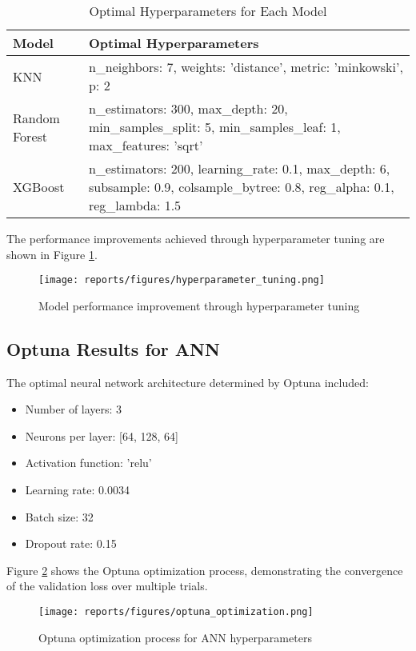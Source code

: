 \documentclass[12pt]{article}
\begin{document}
\begin{table}[h]
\centering
\caption{Optimal Hyperparameters for Each Model}
\label{tab:optimal_hyperparameters}
\begin{tabular}{|l|p{10cm}|}
\hline
\textbf{Model} & \textbf{Optimal Hyperparameters} \\
\hline
KNN & n\_neighbors: 7, weights: 'distance', metric: 'minkowski', p: 2 \\
\hline
Random Forest & n\_estimators: 300, max\_depth: 20, min\_samples\_split: 5, min\_samples\_leaf: 1, max\_features: 'sqrt' \\
\hline
XGBoost & n\_estimators: 200, learning\_rate: 0.1, max\_depth: 6, subsample: 0.9, colsample\_bytree: 0.8, reg\_alpha: 0.1, reg\_lambda: 1.5 \\
\hline
\end{tabular}
\end{table}

The performance improvements achieved through hyperparameter tuning are shown in Figure \ref{fig:hyperparameter_tuning}.

\begin{figure}[h]
\centering
\texttt{[image: reports/figures/hyperparameter\_tuning.png]}
\caption{Model performance improvement through hyperparameter tuning}
\label{fig:hyperparameter_tuning}
\end{figure}

\subsection{Optuna Results for ANN}
\label{subsec:optuna_results}

The optimal neural network architecture determined by Optuna included:
\begin{itemize}
    \item Number of layers: 3
    \item Neurons per layer: [64, 128, 64]
    \item Activation function: 'relu'
    \item Learning rate: 0.0034
    \item Batch size: 32
    \item Dropout rate: 0.15
\end{itemize}

Figure \ref{fig:optuna_optimization} shows the Optuna optimization process, demonstrating the convergence of the validation loss over multiple trials.

\begin{figure}[h]
\centering
\texttt{[image: reports/figures/optuna\_optimization.png]}
\caption{Optuna optimization process for ANN hyperparameters}
\label{fig:optuna_optimization}
\end{figure}
\end{document}
